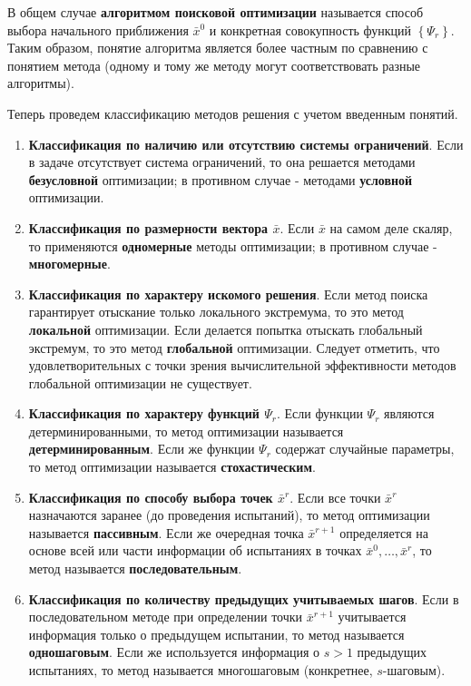 \documentclass[a4paper,12pt]{report}
\begin{document}
В общем случае \textbf{алгоритмом поисковой оптимизации} называется способ выбора начального приближения $\bar{x}^{0}$ и конкретная совокупность функций $\left\{\Psi_{r}\right\}$. Таким образом, понятие алгоритма является более частным по сравнению с понятием метода (одному и тому же методу могут соответствовать разные алгоритмы).

Теперь проведем классификацию методов решения с учетом введенным понятий.

\begin{enumerate}
\item \textbf{Классификация по наличию или отсутствию системы ограничений}. Если в задаче отсутствует система ограничений, то она решается методами \textbf{безусловной} оптимизации; в противном случае - методами \textbf{условной} оптимизации.
\item \textbf{Классификация по размерности вектора $\bar{x}$}. Если $\bar{x}$ на самом деле скаляр, то применяются \textbf{одномерные} методы оптимизации; в противном случае - \textbf{многомерные}.
\item \textbf{Классификация по характеру искомого решения}. Если метод поиска гарантирует отыскание только локального экстремума, то это метод \textbf{локальной} оптимизации. Если делается попытка отыскать глобальный экстремум, то это метод \textbf{глобальной} оптимизации. Следует отметить, что удовлетворительных с точки зрения вычислительной эффективности методов глобальной оптимизации не существует.
\item \textbf{Классификация по характеру функций $\Psi_{r}$}. Если функции $\Psi_{r}$ являются детерминированными, то метод оптимизации называется \textbf{детерминированным}. Если же функции $\Psi_{r}$ содержат случайные параметры, то метод оптимизации называется \textbf{стохастическим}.
\item \textbf{Классификация по способу выбора точек $\bar{x}^{r}$}. Если все точки $\bar{x}^{r}$ назначаются заранее (до проведения испытаний), то метод оптимизации называется \textbf{пассивным}. Если же очередная точка $\bar{x}^{r+1}$ определяется на основе всей или части информации об испытаниях в точках $\bar{x}^{0},\ldots,\bar{x}^{r}$, то метод называется \textbf{последовательным}.
\item \textbf{Классификация по количеству предыдущих учитываемых шагов}. Если в последовательном методе при определении точки $\bar{x}^{r+1}$ учитывается информация только о предыдущем испытании, то метод называется \textbf{одношаговым}. Если же используется информация о $s > 1$ предыдущих испытаниях, то метод называется многошаговым (конкретнее, $s$-шаговым).

\end{enumerate}
\end{document}
